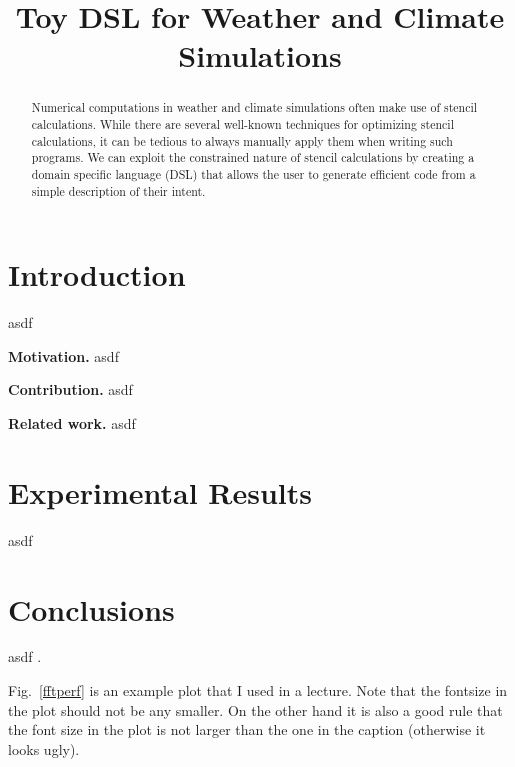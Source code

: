 \documentclass{article}
\title{Toy DSL for Weather and Climate Simulations}
\newcommand{\mypar}[1]{{\bf #1.}}
\begin{document}
\maketitle

\begin{abstract}
Numerical computations in weather and climate simulations often make use of
stencil calculations. While there are several well-known techniques for
optimizing stencil calculations, it can be tedious to always manually apply
them when writing such programs. We can exploit the constrained nature of
stencil calculations by creating a domain specific language (DSL) that allows
the user to generate efficient code from a simple description of their intent.
\end{abstract}

\section{Introduction}\label{sec:intro}

asdf

\mypar{Motivation}
asdf 

\mypar{Contribution}
asdf

\mypar{Related work}
asdf


\section{Experimental Results}\label{sec:exp}

asdf


\section{Conclusions}

asdf  \cite{Higham:98}.

Fig.~\ref{fftperf} is an example plot that I used in a lecture. Note that the fontsize in the plot should not be any smaller. On the other hand it is also a good rule that the font size in the plot is not larger than the one in the caption (otherwise it looks ugly).

\end{document}
